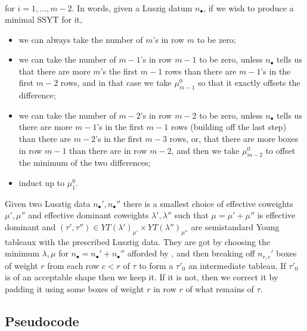 \documentclass[draft]{article}
\begin{document}
\begin{lemma}
\[\begin{gathered}
        \end{gathered}
    \]
    for $i = 1,\dots,m-2$. 
    In words, given a Luszig datum $n_\bullet$, if we wish to produce a minimal SSYT for it, 
    \begin{itemize}
        \item we can always take the number of $m$'s in row $m$ to be zero; 
        \item we can take the number of $m-1$'s in row $m-1$ to be zero, unless $n_\bullet$ tells us that there are more $m$'s the first $m-1$ rows than there are $m-1$'s in the first $m-2$ rows, and in that case we take $\mu^0_{m-1}$ so that it exactly offsets the difference; 
        \item we can take the number of $m-2$'s in row $m-2$ to be zero, unless $n_\bullet$ tells us there are more $m-1$'s in the first $m-1$ rows (building off the last step) than there are $m-2$'s in the first $m-3$ rows, or, that there are more boxes in row $m-1$ than there are in row $m-2$, and then we take $\mu^0_{m-2}$ to offset the minimum of the two differences; 
        \item induct up to $\mu^0_1$. 
    \end{itemize}
\end{lemma}

\begin{proposition}
    \label{prop:minwts}
    Given two Lusztig data $n_\bullet',n_\bullet''$ there is a smallest choice of effective coweights $\mu',\mu''$ and effective dominant coweights $\lambda',\lambda''$ such that $\mu = \mu' + \mu''$ is effective dominant and $(\tau',\tau'')\in YT(\lambda')_{\mu'}\times YT(\lambda'')_{\mu''}$ are semistandard Young tableaux with the prescribed Lusztig data. They are got by choosing the minimum $\lambda,\mu$ for $n_\bullet = n_\bullet ' + n_\bullet ''$ afforded by , and then breaking off $n_{r,c}'$ boxes of weight $r$ from each row $c<r$ of $\tau$ to form a $\tau'_0$ an intermediate tableau. If $\tau'_0$ is of an acceptable shape then we keep it. If it is not, then we correct it by padding it using some boxes of weight $r$ in row $r$ of what remains of $\tau$.

\end{proposition}

\subsection{Pseudocode}
% 
\end{document}
